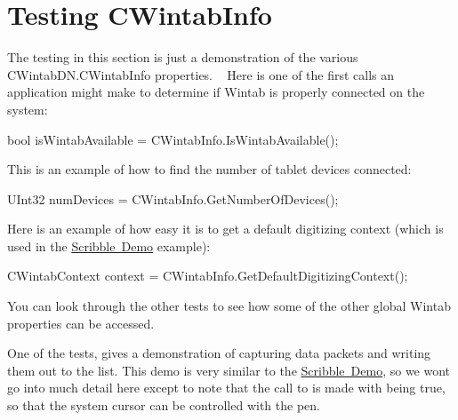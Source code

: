 \hypertarget{page2_testWTInfo_sec}{}\section{Testing C\+Wintab\+Info}\label{page2_testWTInfo_sec}
The testing in this section is just a demonstration of the various C\+Wintab\+D\+N.\+C\+Wintab\+Info properties. ~\newline
 Here is one of the first calls an application might make to determine if Wintab is properly connected on the system\+: 
\begin{DoxyCode}
\textcolor{keywordtype}{bool} isWintabAvailable = CWintabInfo.IsWintabAvailable();
\end{DoxyCode}


This is an example of how to find the number of tablet devices connected\+: 
\begin{DoxyCode}
UInt32 numDevices = CWintabInfo.GetNumberOfDevices();
\end{DoxyCode}


Here is an example of how easy it is to get a default digitizing context (which is used in the \mbox{\hyperlink{page2_scribbleDemo_sec}{Scribble Demo}} example)\+: 
\begin{DoxyCode}
CWintabContext context = CWintabInfo.GetDefaultDigitizingContext();
\end{DoxyCode}


You can look through the other tests to see how some of the other global Wintab properties can be accessed.

One of the tests, {} gives a demonstration of capturing data packets and writing them out to the list. This demo is very similar to the \mbox{\hyperlink{page2_scribbleDemo_sec}{Scribble Demo}}, so we won\textquotesingle{}t go into much detail here except to note that the call to {} is made with {} being true, so that the system cursor can be controlled with the pen. 